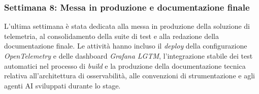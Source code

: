 \subsubsection*{Settimana 8: Messa in produzione e documentazione finale}
L'ultima settimana è stata dedicata alla messa in produzione della soluzione di telemetria, al consolidamento della suite di test e alla redazione della documentazione finale.
Le attività hanno incluso il \emph{deploy} della configurazione \emph{OpenTelemetry} e delle dashboard \emph{Grafana LGTM}, l’integrazione stabile dei test automatici nel processo di \emph{build} e la produzione della documentazione tecnica relativa all’architettura di osservabilità, alle convenzioni di strumentazione e agli agenti AI sviluppati durante lo stage.


